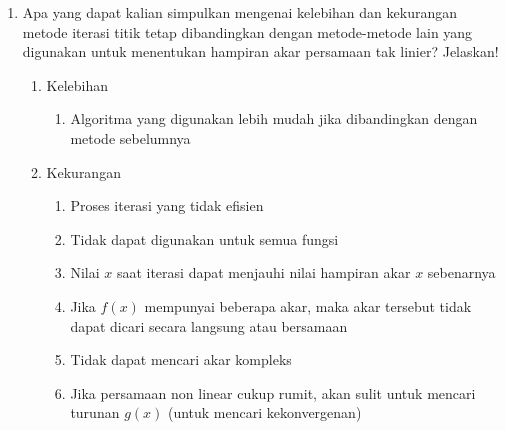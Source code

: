 \documentclass[12pt]{article}
\begin{document}
\begin{enumerate}
{\begin{enumerate}
{                Diperoleh hasil akhir $ x = -3.53368421703493 $
            }
        \end{enumerate}
        Dari semua kemungkinan, diperoleh
        \begin{enumerate}
            \item fungsi $ g_3(x) $ dengan $ x_0 = 1 $ konvergen dan diperoleh hasil akhir $ x = 0.9157511353924488 $
            \item fungsi $ g_3(x) $ dengan $ x_0 = -3 $ konvergen dan diperoleh hasil akhir $ x = 0.9157549868296531 $
            \item fungsi $ g_5(x) $ dengan $ x_0 = 1 $ konvergen dan diperoleh hasil akhir $ x = 0.915750069217386 $
            \item fungsi $ g_6(x) $ dengan $ x_0 = -3 $ konvergen dan diperoleh hasil akhir $ x = -3.53368421703493 $
        \end{enumerate}
    }
    \item {
        Apa yang dapat kalian simpulkan mengenai kelebihan dan kekurangan metode iterasi titik tetap dibandingkan dengan metode-metode lain yang digunakan untuk menentukan hampiran akar persamaan tak linier? Jelaskan!
        \begin{enumerate}
            \item {
                Kelebihan
                \begin{enumerate}
                    \item Algoritma yang digunakan lebih mudah jika dibandingkan dengan metode sebelumnya
                \end{enumerate}
            }
            \item {
                Kekurangan
                \begin{enumerate}
                    \item Proses iterasi yang tidak efisien
                    \item Tidak dapat digunakan untuk semua fungsi
                    \item Nilai $x$ saat iterasi dapat menjauhi nilai hampiran akar $x$ sebenarnya
                    \item Jika $f(x)$ mempunyai beberapa akar, maka akar tersebut tidak dapat dicari secara langsung atau bersamaan
                    \item Tidak dapat mencari akar kompleks
                    \item Jika persamaan non linear cukup rumit, akan sulit untuk mencari turunan $g(x)$ (untuk mencari kekonvergenan)

\end{enumerate}}
\end{enumerate}}
\end{enumerate}
\end{document}
